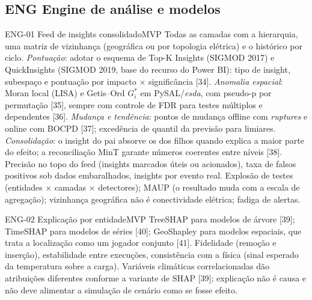 \subsection{ENG \textperiodcentered{} Engine de análise e modelos}

\begin{ficha}{ENG-01 \textperiodcentered{} Feed de insights consolidado}{MVP}
 Todas as camadas com a hierarquia, uma matriz de vizinhança
(geográfica ou por topologia elétrica) e o histórico por ciclo.
 \emph{Pontuação}: adotar o esquema de Top-K Insights
(SIGMOD 2017) e QuickInsights (SIGMOD 2019, base do recurso do Power BI):
tipo de insight, subespaço e pontuação por impacto × significância [34].
\emph{Anomalia espacial}: Moran local (LISA) e Getis--Ord $G_i^*$ em
PySAL/\emph{esda}, com pseudo-p por permutação [35], sempre com controle de
FDR para testes múltiplos e dependentes [36]. \emph{Mudança e tendência}:
pontos de mudança offline com \emph{ruptures} e online com BOCPD [37];
excedência de quantil da previsão para limiares. \emph{Consolidação}: o
insight do pai absorve os dos filhos quando explica a maior parte do efeito;
a reconciliação MinT garante números coerentes entre níveis [38].
 Precisão no topo do feed (insights marcados úteis ou
acionados), taxa de falsos positivos sob dados embaralhados, insights por
evento real.
 Explosão de testes (entidades × camadas × detectores);
MAUP (o resultado muda com a escala de agregação); vizinhança geográfica não
é conectividade elétrica; fadiga de alertas.
\end{ficha}

\begin{ficha}{ENG-02 \textperiodcentered{} Explicação por entidade}{MVP}
 TreeSHAP para modelos de árvore [39]; TimeSHAP para
modelos de séries [40]; GeoShapley para modelos espaciais, que trata a
localização como um jogador conjunto [41].
 Fidelidade (remoção e inserção), estabilidade entre
execuções, consistência com a física (sinal esperado da temperatura sobre a
carga).
 Variáveis climáticas correlacionadas dão atribuições
diferentes conforme a variante de SHAP [39]; explicação não é causa e não
deve alimentar a simulação de cenário como se fosse efeito.
\end{ficha}

